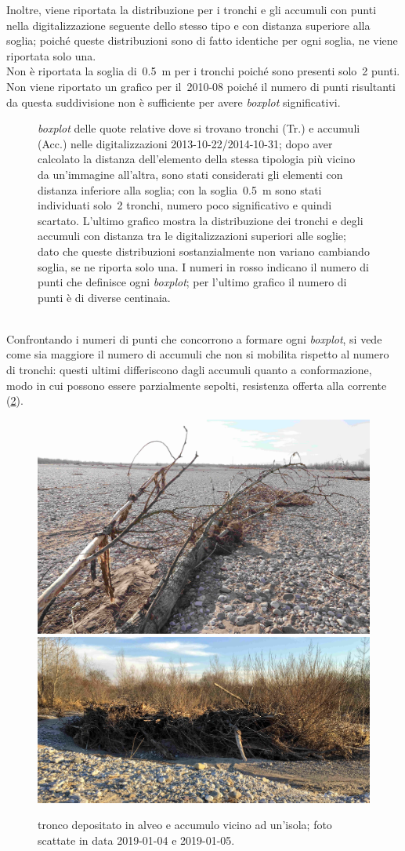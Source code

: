 Inoltre, viene riportata la distribuzione per i tronchi e gli accumuli con punti nella digitalizzazione seguente dello stesso tipo e con distanza superiore alla soglia; poiché queste distribuzioni sono di fatto identiche per ogni soglia, ne viene riportata solo una.
\\
Non è riportata la soglia di~\SI{0.5}{\m} per i tronchi poiché sono presenti solo~2 punti.
Non viene riportato un grafico per il~2010-08 poiché il numero di punti risultanti da questa suddivisione non è sufficiente per avere \emph{boxplot} significativi.
%
\begin{figure}
	\centering
	
	\caption[\emph{boxplot} delle quote relative distinte per tronchi e accumuli legnosi]{\emph{boxplot} delle quote relative dove si trovano tronchi (Tr.) e accumuli (Acc.) nelle digitalizzazioni 2013-10-22/2014-10-31; dopo aver calcolato la distanza dell'elemento della stessa tipologia più vicino da un'immagine all'altra, sono stati considerati gli elementi con distanza inferiore alla soglia; con la soglia~\SI{0.5}{\m} sono stati individuati solo~\num{2} tronchi, numero poco significativo e quindi scartato.
	L'ultimo grafico mostra la distribuzione dei tronchi e degli accumuli con distanza tra le digitalizzazioni superiori alle soglie; dato che queste distribuzioni sostanzialmente non variano cambiando soglia, se ne riporta solo una.
	I numeri in rosso indicano il numero di punti che definisce ogni \emph{boxplot}; per l'ultimo grafico il numero di punti è di diverse centinaia.}
	\label{graph:legno-wj-dem-detrended-distanza}
\end{figure}
%
\\
Confrontando i numeri di punti che concorrono a formare ogni \emph{boxplot}, si vede come sia maggiore il numero di accumuli che non si mobilita rispetto al numero di tronchi: questi ultimi differiscono dagli accumuli quanto a conformazione, modo in cui possono essere parzialmente sepolti, resistenza offerta alla corrente (\cref{fig:tronco-vs-accumulo}).
%
\begin{figure}
	\centering
	\includegraphics[height = 0.27\textwidth]{files/tronco.jpeg}
	\quad
	\includegraphics[height = 0.27\textwidth]{files/accumulo.jpeg}
	\caption[tronco depositato in alveo e accumulo vicino ad un'isola]{tronco depositato in alveo e accumulo vicino ad un'isola; foto scattate in data 2019-01-04 e 2019-01-05.}
	\label{fig:tronco-vs-accumulo}
\end{figure}
